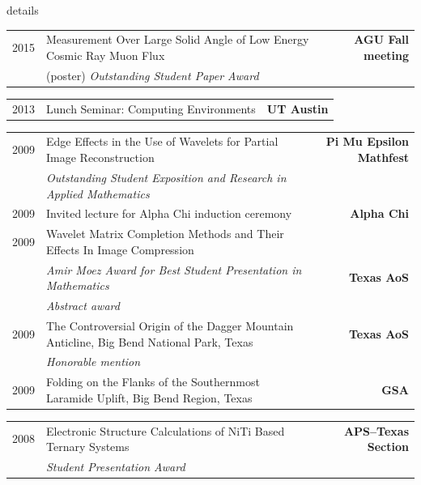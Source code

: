 \documentclass[10pt,letterpaper]{moderncv}
\begin{document}
\begin{taggedblock}{details}
\begin{tabularx}{\textwidth}{p{.33in}X>{\bfseries}r}
    2015 & Measurement Over Large Solid Angle of Low Energy Cosmic Ray Muon Flux &  AGU Fall meeting \\
     & (poster) \emph{Outstanding Student Paper Award} & \\
\end{tabularx}

\begin{tabularx}{\textwidth}{p{.33in}X>{\bfseries}r}
     2013 & Lunch Seminar: Computing Environments & UT Austin \\
\end{tabularx}

\begin{tabularx}{\textwidth}{p{.33in}X>{\bfseries}r}
     2009 & Edge Effects in the Use of Wavelets for Partial Image Reconstruction & Pi Mu Epsilon Mathfest \\
     & \emph{Outstanding Student Exposition and Research in Applied Mathematics} & \\

     2009 & Invited lecture for Alpha Chi induction ceremony & Alpha Chi  \\

     2009 & Wavelet Matrix Completion Methods and Their Effects In Image Compression &  \\
      & \emph{Amir Moez Award for Best Student Presentation in Mathematics} & Texas AoS \\
      & \emph{Abstract award} & \\

      2009 & The Controversial Origin of the Dagger Mountain Anticline, Big Bend National Park, Texas &  Texas AoS \\
      & \emph{Honorable mention} & \\


      2009 & Folding on the Flanks of the Southernmost Laramide Uplift, Big Bend Region, Texas & GSA \\


\end{tabularx}

\begin{tabularx}{\textwidth}{p{.33in}X>{\bfseries}r}
     2008 & Electronic Structure Calculations of NiTi Based Ternary Systems  & APS--Texas Section \\
     & \emph{Student Presentation Award} & \\


\end{tabularx}
\end{taggedblock}
\end{document}
